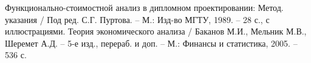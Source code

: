 
 Функционально-стоимостной анализ в дипломном проектировании:
                    Метод. указания / Под ред. С.Г. Пуртова. – М.: Изд-во МГТУ, 1989. –
                    28 с., с иллюстрациями.
 Теория экономического анализа / Баканов М.И., Мельник М.В.,
                    Шеремет А.Д. – 5-е изд., перераб. и доп. – М.: Финансы и статистика,
                    2005. – 536 с.
\endinput
